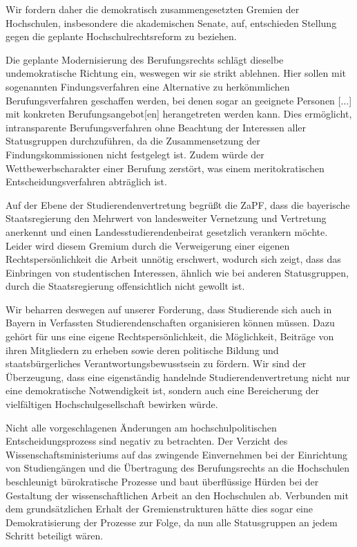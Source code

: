 \documentclass[a4paper]{scrartcl}
\begin{document}
Wir fordern daher die demokratisch zusammengesetzten Gremien der Hochschulen, insbesondere die akademischen Senate, auf, entschieden Stellung gegen die geplante Hochschulrechtsreform zu beziehen.

Die geplante \glqq Modernisierung\grqq{} des Berufungsrechts schlägt dieselbe undemokratische Richtung ein, weswegen wir sie strikt ablehnen. Hier sollen mit sogenannten  \glqq Findungsverfahren\grqq{} eine Alternative zu herkömmlichen Berufungsverfahren geschaffen werden, bei denen sogar an \glqq geeignete Personen [...] mit konkreten Berufungsangebot[en]\grqq{} herangetreten werden kann. Dies ermöglicht, intransparente Berufungsverfahren ohne Beachtung der Interessen aller Statusgruppen durchzuführen, da die Zusammensetzung der Findungskommissionen nicht festgelegt ist. Zudem würde der Wettbewerbscharakter einer Berufung zerstört, was einem meritokratischen Entscheidungsverfahren abträglich ist.

Auf der Ebene der Studierendenvertretung begrüßt die ZaPF, dass die bayerische Staatsregierung den Mehrwert von landesweiter Vernetzung und Vertretung anerkennt und einen Landesstudierendenbeirat gesetzlich verankern möchte. Leider wird diesem Gremium durch die Verweigerung einer eigenen Rechtspersönlichkeit die Arbeit unnötig erschwert, wodurch sich zeigt, dass das Einbringen von studentischen Interessen, ähnlich wie bei anderen Statusgruppen, durch die Staatsregierung offensichtlich nicht gewollt ist.

Wir beharren deswegen auf unserer Forderung, dass Studierende sich auch in Bayern in Verfassten Studierendenschaften organisieren können müssen. Dazu gehört für uns eine eigene Rechtspersönlichkeit, die Möglichkeit, Beiträge von ihren Mitgliedern zu erheben sowie deren politische Bildung und staatsbürgerliches Verantwortungsbewusstsein zu fördern. Wir sind der Überzeugung, dass eine eigenständig handelnde Studierendenvertretung nicht nur eine demokratische Notwendigkeit ist, sondern auch eine Bereicherung der vielfältigen Hochschulgesellschaft bewirken würde.

Nicht alle vorgeschlagenen Änderungen am hochschulpolitischen Entscheidungsprozess sind negativ zu betrachten. Der Verzicht des Wissenschaftsministeriums auf das zwingende Einvernehmen bei der Einrichtung von Studiengängen und die Übertragung des Berufungsrechts an die Hochschulen beschleunigt bürokratische Prozesse und baut überflüssige Hürden bei der Gestaltung der wissenschaftlichen Arbeit an den Hochschulen ab. Verbunden mit dem grundsätzlichen Erhalt der Gremienstrukturen hätte dies sogar eine Demokratisierung der Prozesse zur Folge, da nun alle Statusgruppen an jedem Schritt beteiligt wären.
\end{document}
